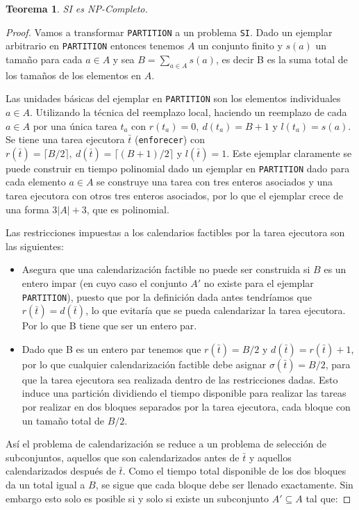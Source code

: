 \documentclass{article}
\newtheorem{theorem}{Teorema}
\begin{document}
\begin{theorem}
  SI es NP-Completo.
\end{theorem}
\begin{proof}
  Vamos a transformar \texttt{PARTITION} a un problema \texttt{SI}. Dado un ejemplar arbitrario en \texttt{PARTITION} entonces tenemos $A$ un conjunto finito y $s(a)$ un tamaño para cada $a \in A$ y sea $B = \sum_{a \in A}  s(a)$, es decir B es la suma total de los tamaños de los elementos en $A$.

  Las unidades básicas del ejemplar en \texttt{PARTITION} son los elementos individuales $a \in A$. Utilizando la técnica del reemplazo local, haciendo un reemplazo de cada $a \in A$ por una única tarea $t_a$ con $r(t_a) = 0,\ d(t_a) = B + 1$ y $l(t_a) = s(a)$. Se tiene una tarea ejecutora $\bar{t}$ (\texttt{enforecer}) con $r(\bar{t}) = \lceil B / 2 \rceil,\ d(\bar{t}) = \lceil (B+1) / 2 \rceil$ y $l(\bar{t}) = 1$. Este ejemplar claramente se puede construir en tiempo polinomial dado un ejemplar en \texttt{PARTITION} dado para cada elemento $a \in A$ se construye una tarea con tres enteros asociados y una tarea ejecutora con otros tres enteros asociados, por lo que el ejemplar crece de una forma $3 |A| + 3$, que es polinomial.

  Las restricciones impuestas a los calendarios factibles por la tarea ejecutora
  son las siguientes:
  \begin{itemize}
  \item Asegura que una calendarización factible no puede ser construida si $B$ es un entero impar (en cuyo caso el conjunto $A'$ no existe para el ejemplar \texttt{PARTITION}), puesto que por la definición dada antes tendríamos que $r(\bar{t}) =d(\bar{t})$, lo que evitaría que se pueda calendarizar la tarea ejecutora. Por lo que B tiene que ser un entero par.
  \item Dado que B es un entero par tenemos que $r(\bar{t}) = B / 2$ y $d(\bar{t}) = r(\bar{t}) + 1$, por lo que cualquier calendarización factible debe asignar $\sigma(\bar{t}) = B / 2$, para que la tarea ejecutora sea realizada dentro de las restricciones dadas. Esto induce una partición dividiendo el tiempo disponible para realizar las tareas por realizar en dos bloques separados por la tarea ejecutora, cada bloque con un tamaño total de $B / 2$.
  \end{itemize}

  Así el problema de calendarización se reduce a un problema de selección de subconjuntos, aquellos que son calendarizados antes de $\bar{t}$ y aquellos calendarizados después de $\bar{t}$. Como el tiempo total disponible de los dos bloques da un total igual a $B$, se sigue que cada bloque debe ser llenado exactamente. Sin embargo esto solo es posible si y solo si existe un subconjunto $A' \subseteq A$ tal que:


\end{proof}
\end{document}
